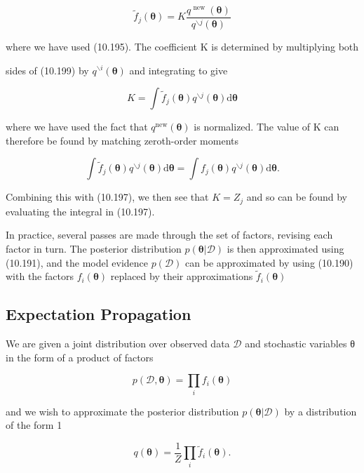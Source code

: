 \documentclass[
  10
]{article}
\begin{document}
\[
\widetilde {f} _ {j} (\boldsymbol {\theta}) = K \frac {q ^ {\text { new }} (\boldsymbol {\theta})}{q ^ {\backslash j} (\boldsymbol {\theta})}\tag{10.199}
\]

where we have used (10.195). The coefficient K is determined by
multiplying both

sides of (10.199) by \(q ^ { \backslash i } ( \pmb \theta )\) and
integrating to give

\[
K = \int \widetilde {f} _ {j} (\boldsymbol {\theta}) q ^ {\backslash j} (\boldsymbol {\theta}) \mathrm{d} \boldsymbol {\theta}\tag{10.200}
\]

where we have used the fact that
\(q ^ { \mathrm { n e w } } ( \pmb { \theta } )\) is normalized. The
value of K can therefore be found by matching zeroth-order moments

\[
\int \widetilde {f} _ {j} (\boldsymbol {\theta}) q ^ {\backslash j} (\boldsymbol {\theta}) \mathrm{d} \boldsymbol {\theta} = \int f _ {j} (\boldsymbol {\theta}) q ^ {\backslash j} (\boldsymbol {\theta}) \mathrm{d} \boldsymbol {\theta}.\tag{10.201}
\]

Combining this with (10.197), we then see that \(K = Z _ { j }\) and so
can be found by evaluating the integral in (10.197).

In practice, several passes are made through the set of factors,
revising each factor in turn. The posterior distribution
\(p ( \pmb \theta | \mathcal { D } )\) is then approximated using
(10.191), and the model evidence \(p ( \mathcal { D } )\) can be
approximated by using (10.190) with the factors
\(f _ { i } ( \pmb \theta )\) replaced by their approximations
\(\widetilde { f } _ { i } ( \pmb \theta )\)

\subsection{Expectation Propagation}\label{expectation-propagation-1}

We are given a joint distribution over observed data \(\mathcal { D }\)
and stochastic variables θ in the form of a product of factors

\[
p (\mathcal {D}, \boldsymbol {\theta}) = \prod_ {i} f _ {i} (\boldsymbol {\theta})\tag{10.202}
\]

and we wish to approximate the posterior distribution
\(p ( \pmb \theta | \mathcal { D } )\) by a distribution of the form 1

\[
q (\pmb {\theta}) = \frac {1}{Z} \prod_ {i} \widetilde {f} _ {i} (\pmb {\theta}).\tag{10.203}
\]
\end{document}
